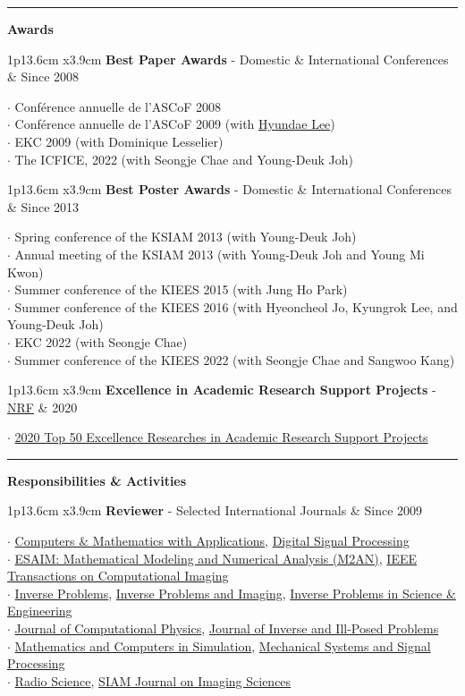 \documentclass[10pt,A4]{article}
\newcommand{\cvsection}[1]
{
	\begin{center}
		\large\textcolor{sectcol}{\textbf{#1}}
	\end{center}
}
\newcommand{\cveventfour}[4]
{

\begin{tabular*}{1\textwidth}{p{13.6cm}  x{3.9cm}}
	\textbf{#2} - \textcolor{bgcol}{#3} &   \vspace{2.5pt}\textcolor{sectcol}{#1}
\end{tabular*}


  $\cdot$ #4\\[3pt]
}
\newcommand{\cveventseven}[7]
{

\begin{tabular*}{1\textwidth}{p{13.6cm}  x{3.9cm}}
	\textbf{#2} - \textcolor{bgcol}{#3} &   \vspace{2.5pt}\textcolor{sectcol}{#1}
\end{tabular*}


  $\cdot$ #4\\[3pt]
  $\cdot$ #5\\[3pt]
  $\cdot$ #6\\[3pt]
  $\cdot$ #7\\[6pt]

}
\newcommand{\cveventnine}[9]
{

\begin{tabular*}{1\textwidth}{p{13.6cm}  x{3.9cm}}
	\textbf{#2} - \textcolor{bgcol}{#3} &   \vspace{2.5pt}\textcolor{sectcol}{#1}
\end{tabular*}


  $\cdot$ #4\\[3pt]
  $\cdot$ #5\\[3pt]
  $\cdot$ #6\\[3pt]
  $\cdot$ #7\\[3pt]
  $\cdot$ #8\\[3pt]
  $\cdot$ #9\\[6pt]

}
\begin{document}
\textcolor{softcol}{\hrule}

\cvsection{Awards}

\cveventseven{Since 2008}{Best Paper Awards}{Domestic \& International Conferences}{Conf\'erence annuelle de l'ASCoF 2008}{Conf\'erence annuelle de l'ASCoF 2009 (with \href{http://people.math.inha.ac.kr/~hdlee/}{Hyundae Lee})}{EKC 2009 (with Dominique Lesselier)}{The \nth{14} ICFICE, 2022 (with Seongje Chae and Young-Deuk Joh)}

\cveventnine{Since 2013}{Best Poster Awards}{Domestic \& International Conferences}{Spring conference of the KSIAM 2013 (with Young-Deuk Joh)}{Annual meeting of the KSIAM 2013 (with Young-Deuk Joh and Young Mi Kwon)}{Summer conference of the KIEES 2015 (with Jung Ho Park)}{Summer conference of the KIEES 2016 (with Hyeoncheol Jo, Kyungrok Lee, and Young-Deuk Joh)}{EKC 2022 (with Seongje Chae)}{Summer conference of the KIEES 2022 (with Seongje Chae and Sangwoo Kang)}

\cveventfour{2020}{Excellence in Academic Research Support Projects}{\href{https://www.nrf.re.kr/index}{NRF}}{\href{https://moe.go.kr/boardCnts/view.do?boardID=333&boardSeq=83054&lev=0&searchType=null&statusYN=W&page=1&s=moe&m=0501&opType=N}{2020 Top 50 Excellence Researches in Academic Research Support Projects}}%
%
\textcolor{softcol}{\hrule}

\cvsection{Responsibilities \& Activities}
\cveventnine{Since 2009}{Reviewer}{Selected International Journals}{\href{http://www.journals.elsevier.com/computers-and-mathematics-with-applications/}{Computers \& Mathematics with Applications}, \href{https://www.journals.elsevier.com/digital-signal-processing}{Digital Signal Processing}}{\href{http://www.esaim-m2an.org/}{ESAIM: Mathematical Modeling and Numerical Analysis (M2AN)}, \href{http://ieeexplore.ieee.org/xpl/RecentIssue.jsp?punumber=6745852}{IEEE Transactions on Computational Imaging}}{\href{http://www.iop.org/EJ/journal/IP/}{Inverse Problems}, \href{http://www.aimsciences.org/journals/home.jsp?journalID=11}{Inverse Problems and Imaging}, \href{http://www.tandfonline.com/action/journalInformation?journalCode=gipe20}{Inverse Problems in Science \& Engineering}}{\href{https://www.journals.elsevier.com/journal-of-computational-physics}{Journal of Computational Physics}, \href{http://www.degruyter.com/view/j/jiip}{Journal of Inverse and Ill-Posed Problems}}{\href{https://www.journals.elsevier.com/mathematics-and-computers-in-simulation}{Mathematics and Computers in Simulation}, \href{https://www.journals.elsevier.com/mechanical-systems-and-signal-processing}{Mechanical Systems and Signal Processing}}{\href{http://agupubs.onlinelibrary.wiley.com/hub/journal/10.1002/(ISSN)1944-799X/}{Radio Science}, \href{http://www.siam.org/journals/siims.php}{SIAM Journal on Imaging Sciences}}
\end{document}
